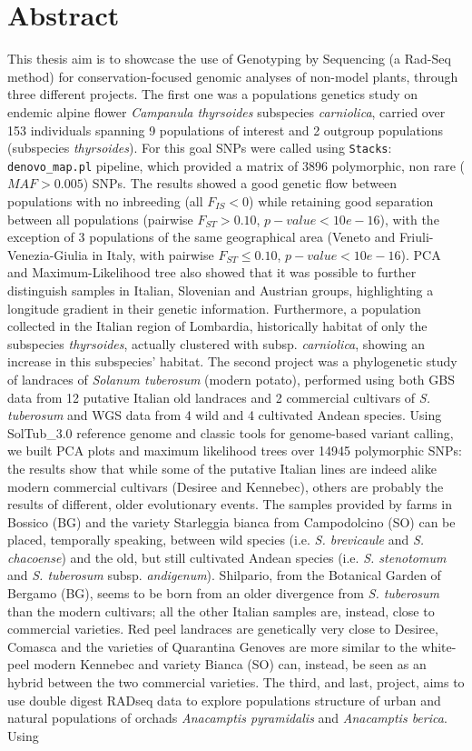\documentclass[a4paper, 12pt]{report}
\begin{document}
\chapter*{Abstract}
This thesis aim is to showcase the use of Genotyping by Sequencing (a Rad-Seq method) for conservation-focused genomic analyses of non-model plants, through three different projects. The first one was a populations genetics study on endemic alpine flower \textit{Campanula thyrsoides} subspecies \textit{carniolica}, carried over 153 individuals spanning 9 populations of interest and 2 outgroup populations (subspecies \textit{thyrsoides}). For this goal SNPs were called using \texttt{Stacks}: \texttt{denovo\_map.pl} pipeline, which provided a matrix of 3896 polymorphic, non rare ($MAF > 0.005$) SNPs. The results showed a good genetic flow between populations with no inbreeding (all $F_{IS} < 0$) while retaining good separation between all populations (pairwise $F_{ST} > 0.10$, $p-value < 10e-16$), with the exception of 3 populations of the same geographical area (Veneto and Friuli-Venezia-Giulia in Italy, with pairwise $F_{ST} \leq 0.10$, $p-value < 10e-16$). PCA and Maximum-Likelihood tree also showed that it was possible to further distinguish samples in Italian, Slovenian and Austrian groups, highlighting a longitude gradient in their genetic information. Furthermore, a population collected in the Italian region of Lombardia, historically habitat of only the subspecies \textit{thyrsoides}, actually clustered with subsp. \textit{carniolica}, showing an increase in this subspecies' habitat. The second project was a phylogenetic study of landraces of \textit{Solanum tuberosum} (modern potato), performed using both GBS data from 12 putative Italian old landraces and 2 commercial cultivars of \textit{S. tuberosum} and WGS data from 4 wild and 4 cultivated Andean species. Using SolTub\_3.0 reference genome and classic tools for genome-based variant calling, we built PCA plots and maximum likelihood trees over 14945 polymorphic SNPs: the results show that while some of the putative Italian lines are indeed alike modern commercial cultivars (Desiree and Kennebec), others are probably the results of different, older evolutionary events. The samples provided by farms in Bossico (BG) and the variety Starleggia bianca from Campodolcino (SO) can be placed, temporally speaking, between wild species (i.e. \textit{S. brevicaule} and \textit{S. chacoense}) and the old, but still cultivated Andean species (i.e. \textit{S. stenotomum} and \textit{S. tuberosum} subsp. \textit{andigenum}). Shilpario, from the Botanical Garden of Bergamo (BG), seems to be born from an older divergence from \textit{S. tuberosum} than the modern cultivars; all the other Italian samples are, instead, close to commercial varieties. Red peel landraces are genetically very close to Desiree, Comasca and the varieties of Quarantina Genoves are more similar to the white-peel modern Kennebec and variety Bianca (SO) can, instead, be seen as an hybrid between the two commercial varieties. The third, and last, project, aims to use double digest RADseq data to explore populations structure of urban and natural populations of orchads \textit{Anacamptis pyramidalis} and \textit{Anacamptis berica}. Using 
\end{document}
